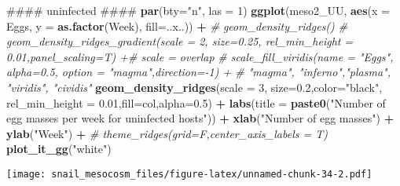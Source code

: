 \documentclass[10,portrait]{article}
\newenvironment{Shaded}{\begin{snugshade}}{\end{snugshade}}
\newcommand{\KeywordTok}[1]{\textcolor[rgb]{0.13,0.29,0.53}{\textbf{#1}}}
\newcommand{\DataTypeTok}[1]{\textcolor[rgb]{0.13,0.29,0.53}{#1}}
\newcommand{\DecValTok}[1]{\textcolor[rgb]{0.00,0.00,0.81}{#1}}
\newcommand{\FloatTok}[1]{\textcolor[rgb]{0.00,0.00,0.81}{#1}}
\newcommand{\StringTok}[1]{\textcolor[rgb]{0.31,0.60,0.02}{#1}}
\newcommand{\CommentTok}[1]{\textcolor[rgb]{0.56,0.35,0.01}{\textit{#1}}}
\newcommand{\OperatorTok}[1]{\textcolor[rgb]{0.81,0.36,0.00}{\textbf{#1}}}
\newcommand{\NormalTok}[1]{#1}
\begin{document}
\begin{Shaded}
\begin{Highlighting}[]
\NormalTok{#### uninfected ####}
\KeywordTok{par}\NormalTok{(}\DataTypeTok{bty=}\StringTok{"n"}\NormalTok{, }\DataTypeTok{las =} \DecValTok{1}\NormalTok{)}
\KeywordTok{ggplot}\NormalTok{(meso2_UU, }\KeywordTok{aes}\NormalTok{(}\DataTypeTok{x =}\NormalTok{ Eggs, }\DataTypeTok{y =} \KeywordTok{as.factor}\NormalTok{(Week), }\DataTypeTok{fill=}\NormalTok{..x..)) }\OperatorTok{+}\StringTok{ }\CommentTok{# geom_density_ridges()}
\StringTok{  }\CommentTok{# geom_density_ridges_gradient(scale = 2, size=0.25, rel_min_height = 0.01,panel_scaling=T) +# scale = overlap}
\StringTok{  }\CommentTok{# scale_fill_viridis(name = "Eggs", alpha=0.5, option = "magma",direction=-1) + # "magma", "inferno","plasma", "viridis", "cividis"}
\StringTok{  }\KeywordTok{geom_density_ridges}\NormalTok{(}\DataTypeTok{scale =} \DecValTok{3}\NormalTok{, }\DataTypeTok{size=}\FloatTok{0.2}\NormalTok{,}\DataTypeTok{color=}\StringTok{"black"}\NormalTok{, }\DataTypeTok{rel_min_height =} \FloatTok{0.01}\NormalTok{,}\DataTypeTok{fill=}\NormalTok{col,}\DataTypeTok{alpha=}\FloatTok{0.5}\NormalTok{) }\OperatorTok{+}
\StringTok{  }\KeywordTok{labs}\NormalTok{(}\DataTypeTok{title =} \KeywordTok{paste0}\NormalTok{(}\StringTok{"Number of egg masses per week for uninfected hosts"}\NormalTok{)) }\OperatorTok{+}
\StringTok{  }\KeywordTok{xlab}\NormalTok{(}\StringTok{"Number of egg masses"}\NormalTok{) }\OperatorTok{+}
\StringTok{  }\KeywordTok{ylab}\NormalTok{(}\StringTok{"Week"}\NormalTok{) }\OperatorTok{+}
\StringTok{  }\CommentTok{# theme_ridges(grid=F,center_axis_labels = T)}
\StringTok{  }\KeywordTok{plot_it_gg}\NormalTok{(}\StringTok{"white"}\NormalTok{)}
\end{Highlighting}
\end{Shaded}

\texttt{[image: snail\_mesocosm\_files/figure-latex/unnamed-chunk-34-2.pdf]}
\end{document}
